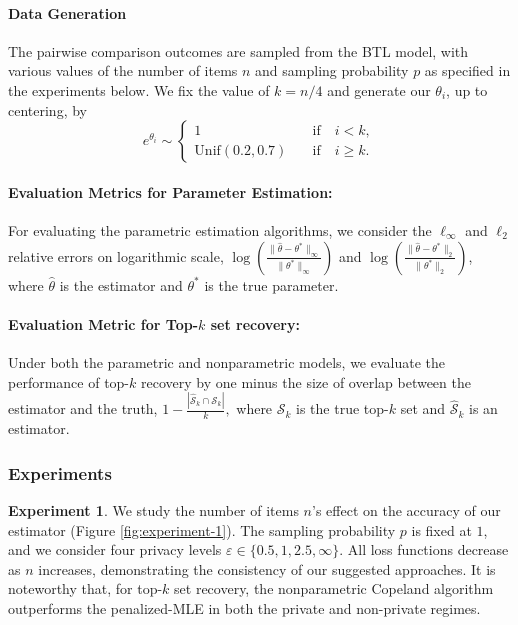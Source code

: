 \documentclass[letterpaper,12pt]{article}
\numberwithin{equation}{section}
\theoremstyle{plain}
\numberwithin{Theorem}{section}
\numberwithin{corollary}{section}
\numberwithin{proposition}{section}
\numberwithin{Lemma}{section}
{
	\theoremstyle{definition}
	\newtheorem{Definition}{Definition}
	\newtheorem{example}{Example}
	\numberwithin{example}{section}
	\newtheorem{fact}{Fact}
	\numberwithin{fact}{section}
	\newtheorem{remark}{Remark}
}
\newcommand{\1}{\mathbbm{1}}
\begin{document}
\paragraph {Data Generation}
The pairwise comparison outcomes are sampled from the BTL model, with various values of the number of items $n$ and sampling probability $p$ as specified in the experiments below. We fix the value of $k = n/4$ and generate our $\theta_i$, up to centering, by
$$
e^{\theta_i} \sim 
\begin{cases}
	1 \quad &\mathrm{if} \quad i < k, \\
	\mathrm{Unif}(0.2,0.7)  \quad &\mathrm{if} \quad i \geq k.
\end{cases}	
$$

   
 
\paragraph{Evaluation Metrics for Parameter Estimation:}   
For evaluating the parametric estimation algorithms, we consider the $\ell_\infty$ and $\ell_2$ relative errors on logarithmic scale, $\log \left(\frac{\|\hat \theta-\theta^*\|_\infty}{\|\theta^*\|_\infty}\right)$ and $\log \left(\frac{\|\hat \theta-\theta^*\|_2}{\|\theta^*\|_2}\right)$, where $\hat\theta$ is the estimator and $\theta^*$ is the true parameter.

\paragraph{Evaluation Metric for Top-$k$ set recovery:} Under both the parametric and nonparametric models, we evaluate the performance of top-$k$ recovery by one minus the size of overlap between the estimator and the truth, 
$
1 - \frac{|\widehat{\mathcal{S}}_k \cap \mathcal{S}_k|}{k},
$
where $\mathcal{S}_k$ is the true top-$k$ set and $\widehat{\mathcal{S}}_k$ is an estimator.


\subsubsection{Experiments}

{\bf Experiment 1}.  We study the number of items $n$'s effect on the accuracy of our estimator (Figure \ref{fig:experiment-1}). The sampling probability $p$ is fixed at $1$, and we consider four  privacy levels $\varepsilon \in \{0.5, 1, 2.5, \infty\}$. All loss functions decrease as $n$ increases, demonstrating the consistency of our suggested approaches. It is noteworthy that, for top-$k$ set recovery,  the nonparametric Copeland algorithm outperforms the penalized-MLE  in both the private and non-private regimes. 
\end{document}

